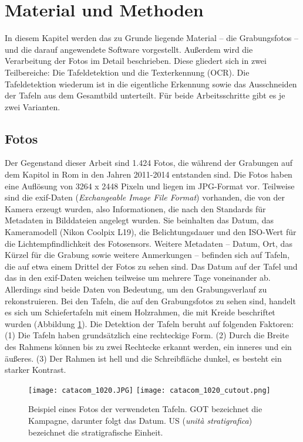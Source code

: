 \section{Material und Methoden}

In diesem Kapitel werden das zu Grunde liegende Material -- die Grabungsfotos -- und die darauf angewendete Software vorgestellt. Außerdem wird die Verarbeitung der Fotos im Detail beschrieben. 
Diese gliedert sich in zwei Teilbereiche: Die Tafeldetektion und die Texterkennung (OCR). Die Tafeldetektion wiederum ist in die eigentliche Erkennung sowie das Ausschneiden der Tafeln aus dem Gesamtbild unterteilt. Für beide Arbeitsschritte gibt es je zwei Varianten.
\subsection{Fotos}
Der Gegenstand dieser Arbeit sind 1.424 Fotos, die während der Grabungen auf dem Kapitol in Rom in den Jahren 2011-2014 entstanden sind. Die Fotos haben eine Auflösung von 3264 x 2448 Pixeln und liegen im JPG-Format vor. Teilweise sind die exif-Daten (\textit{Exchangeable Image File Format}) vorhanden, die von der Kamera erzeugt wurden, also Informationen, die nach den Standards für Metadaten in Bilddateien\cite{exif}{} angelegt wurden. Sie beinhalten das Datum, das Kameramodell (Nikon Coolpix L19), die Belichtungsdauer und den ISO-Wert für die Lichtempfindlichkeit des Fotosensors. Weitere Metadaten -- Datum, Ort, das Kürzel für die Grabung sowie weitere Anmerkungen -- befinden sich auf Tafeln, die auf etwa einem Drittel der Fotos zu sehen sind. Das Datum auf der Tafel und das in den exif-Daten weichen teilweise um mehrere Tage voneinander ab. Allerdings sind beide Daten von Bedeutung, um den Grabungsverlauf zu rekonstruieren.
Bei den Tafeln, die auf den Grabungsfotos zu sehen sind, handelt es sich um Schiefertafeln mit einem Holzrahmen, die mit Kreide beschriftet wurden (Abbildung \ref{fig:einfachetafel}). Die Detektion der Tafeln beruht auf folgenden Faktoren: (1) Die Tafeln haben grundsätzlich eine rechteckige Form. (2) Durch die Breite des Rahmens können bis zu zwei Rechtecke erkannt werden, ein inneres und ein äußeres. (3) Der Rahmen ist hell und die Schreibfläche dunkel, es besteht ein starker Kontrast.
\begin{figure}[!h]
\texttt{[image: catacom\_1020.JPG]}
\texttt{[image: catacom\_1020\_cutout.png]}
\caption{Beispiel eines Fotos der verwendeten Tafeln. GOT bezeichnet die Kampagne, darunter folgt das Datum. US (\textit{unità stratigrafica}) bezeichnet die stratigrafische Einheit.}
\label{fig:einfachetafel}
\end{figure}
